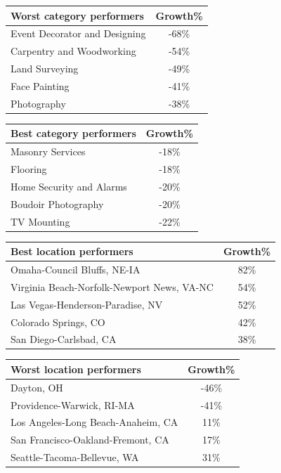 \documentclass{article}[12pt]
\begin{document}
\begin{tabular}{|l|c|}
\hline
Worst category performers & Growth\% \\
\hline
Event Decorator and Designing & -68\% \\
Carpentry and Woodworking & -54\% \\
Land Surveying & -49\% \\
Face Painting & -41\% \\
Photography & -38\% \\
\hline
\end{tabular}



\begin{tabular}{|l|c|}
\hline
Best category performers & Growth\% \\
\hline
Masonry Services & -18\% \\
Flooring & -18\% \\
Home Security and Alarms & -20\% \\
Boudoir Photography & -20\% \\
TV Mounting & -22\% \\
\hline
\end{tabular}



\begin{tabular}{|l|c|}
\hline
Best location performers & Growth\% \\
\hline
Omaha-Council Bluffs, NE-IA & 82\% \\
Virginia Beach-Norfolk-Newport News, VA-NC & 54\% \\
Las Vegas-Henderson-Paradise, NV & 52\% \\
Colorado Springs, CO & 42\% \\
San Diego-Carlsbad, CA & 38\% \\
\hline
\end{tabular}



\begin{tabular}{|l|c|}
\hline
Worst location performers & Growth\% \\
\hline
Dayton, OH & -46\% \\
Providence-Warwick, RI-MA & -41\% \\
Los Angeles-Long Beach-Anaheim, CA & 11\% \\
San Francisco-Oakland-Fremont, CA & 17\% \\
Seattle-Tacoma-Bellevue, WA & 31\% \\
\hline
\end{tabular}
\end{document}
